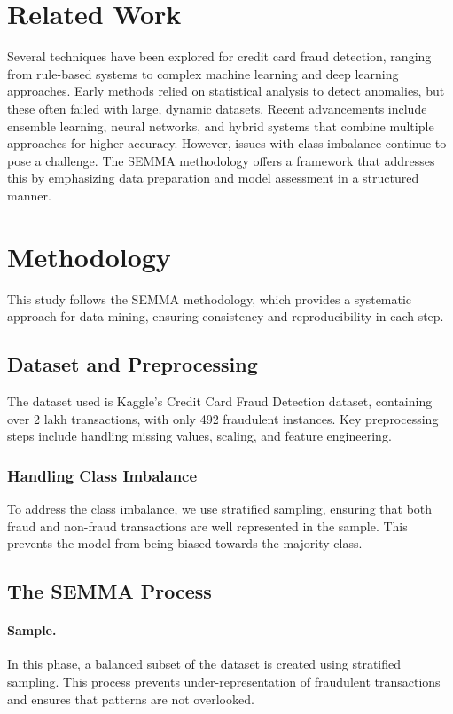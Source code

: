 \documentclass{article} %
\begin{document}
\section{Related Work}
Several techniques have been explored for credit card fraud detection, ranging from rule-based systems to complex machine learning and deep learning approaches. Early methods relied on statistical analysis to detect anomalies, but these often failed with large, dynamic datasets. Recent advancements include ensemble learning, neural networks, and hybrid systems that combine multiple approaches for higher accuracy. However, issues with class imbalance continue to pose a challenge. The SEMMA methodology offers a framework that addresses this by emphasizing data preparation and model assessment in a structured manner.

\section{Methodology}
This study follows the SEMMA methodology, which provides a systematic approach for data mining, ensuring consistency and reproducibility in each step. 

\subsection{Dataset and Preprocessing}
The dataset used is Kaggle’s Credit Card Fraud Detection dataset, containing over 2 lakh transactions, with only 492 fraudulent instances. Key preprocessing steps include handling missing values, scaling, and feature engineering.

\subsubsection{Handling Class Imbalance}
To address the class imbalance, we use stratified sampling, ensuring that both fraud and non-fraud transactions are well represented in the sample. This prevents the model from being biased towards the majority class.

\subsection{The SEMMA Process}
\paragraph{Sample.} In this phase, a balanced subset of the dataset is created using stratified sampling. This process prevents under-representation of fraudulent transactions and ensures that patterns are not overlooked.
\end{document}
